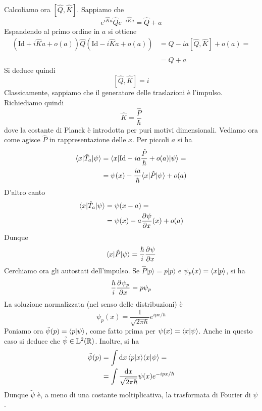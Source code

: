 \documentclass[a4paper, 11pt]{article}
\newcommand{\id}{\mathrm{Id}}
\renewcommand{\L}{\mathbb{L}}
\newcommand{\pos}{\hat{Q}}
\newcommand{\Imp}{\hat{P}}
\renewcommand{\ket}[1]{| #1\rangle}
\begin{document}
Calcoliamo ora $[\pos,\hat{K}]$. Sappiamo che
\[e^{i\hat{K}a}\hat{Q}e^{-i\hat Ka}=\pos+a\]
Espandendo al primo ordine in $a$ si ottiene
\begin{align*}(\id+i\hat{K}a+o(a))\pos(\id-i\hat{K}a+o(a))&=\pos-ia[\pos,\hat{K}]+o(a)=\\&=\pos+a\end{align*}
Si deduce quindi
\[[\pos,\hat{K}]=i\]
Classicamente, sappiamo che il generatore delle traslazioni è l'impulso. Richiediamo quindi
\[\hat{K}=\frac{\hat{P}}{\hbar}\]
dove la costante di Planck è introdotta per puri motivi dimensionali. 
Vediamo ora come agisce $\Imp$ in rappresentazione delle $x$. Per piccoli $a$ si ha
\begin{align*}
	\braketop{x}{\hat{T}_a}{\psi}&=\braketop{x}{\id-ia\frac{\Imp}{\hbar}+o(a)}{\psi}=\\&=\psi(x)-\frac{ia}{\hbar}\braketop{x}{\Imp}{\psi}+o(a)	
\end{align*}
D'altro canto
\begin{align*}\langle x|\hat{T}_a|\psi\rangle&=\psi(x-a)=\\&=\psi(x)-a\dfrac{\partial ^{}\psi}{\partial {x}^{}}(x)+o(a)\end{align*}
Dunque
\[\braketop{x}{\Imp}{\psi}=\frac{\hbar}{i}\pder{\psi}{x}\]
Cerchiamo ora gli autostati dell'impulso. Se $\Imp\ket{p}=p\ket{p}$ e $\psi_p(x)=\langle x\vert p\rangle$, si ha
\[\frac{\hbar}{i}\dfrac{\partial ^{}\psi_p}{\partial {x}^{}}=p\psi_p\]
La soluzione normalizzata (nel senso delle distribuzioni) è
\[\psi_p(x)=\frac{1}{\sqrt{2\pi \hbar}}e^{ipx/\hbar}\]
Poniamo ora $\tilde{\psi}(p)=\langle p\vert\psi\rangle$, come fatto prima per $\psi(x)=\langle x\vert\psi\rangle$. Anche in questo caso si deduce che $\tilde{\psi}\in\L^2(\R)$. Inoltre, si ha
\begin{align*}
	\tilde{\psi}(p)&=\int \mathrm{d} x\,\langle p\vert x\rangle\langle x\vert\psi\rangle=\\&=\int \frac{\mathrm{d} x}{\sqrt{2\pi \hbar}}\psi(x)e^{-ipx/\hbar}
\end{align*}
Dunque $\tilde{\psi}$ è, a meno di una costante moltiplicativa, la trasformata di Fourier di $\psi$.
\end{document}
